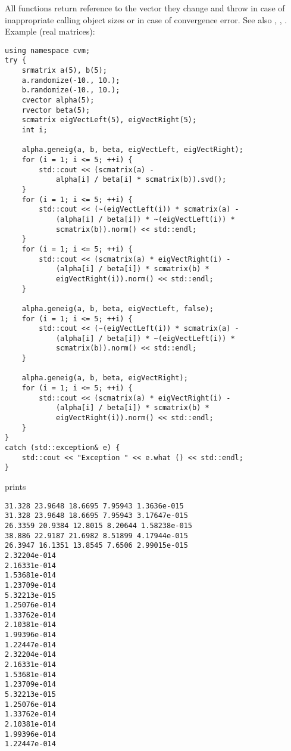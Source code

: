 All functions
return  reference to the vector they change and throw
in case of inappropriate calling object sizes
or in case of convergence error.
See also
, ,
.
Example (real matrices):
\begin{Verbatim}
using namespace cvm;
try {
    srmatrix a(5), b(5);
    a.randomize(-10., 10.);
    b.randomize(-10., 10.);
    cvector alpha(5);
    rvector beta(5);
    scmatrix eigVectLeft(5), eigVectRight(5);
    int i;

    alpha.geneig(a, b, beta, eigVectLeft, eigVectRight);
    for (i = 1; i <= 5; ++i) {
        std::cout << (scmatrix(a) -
            alpha[i] / beta[i] * scmatrix(b)).svd();
    }
    for (i = 1; i <= 5; ++i) {
        std::cout << (~(eigVectLeft(i)) * scmatrix(a) -
            (alpha[i] / beta[i]) * ~(eigVectLeft(i)) *
            scmatrix(b)).norm() << std::endl;
    }
    for (i = 1; i <= 5; ++i) {
        std::cout << (scmatrix(a) * eigVectRight(i) -
            (alpha[i] / beta[i]) * scmatrix(b) *
            eigVectRight(i)).norm() << std::endl;
    }

    alpha.geneig(a, b, beta, eigVectLeft, false);
    for (i = 1; i <= 5; ++i) {
        std::cout << (~(eigVectLeft(i)) * scmatrix(a) -
            (alpha[i] / beta[i]) * ~(eigVectLeft(i)) *
            scmatrix(b)).norm() << std::endl;
    }

    alpha.geneig(a, b, beta, eigVectRight);
    for (i = 1; i <= 5; ++i) {
        std::cout << (scmatrix(a) * eigVectRight(i) -
            (alpha[i] / beta[i]) * scmatrix(b) *
            eigVectRight(i)).norm() << std::endl;
    }
}
catch (std::exception& e) {
    std::cout << "Exception " << e.what () << std::endl;
}
\end{Verbatim}
prints
\begin{Verbatim}
31.328 23.9648 18.6695 7.95943 1.3636e-015
31.328 23.9648 18.6695 7.95943 3.17647e-015
26.3359 20.9384 12.8015 8.20644 1.58238e-015
38.886 22.9187 21.6982 8.51899 4.17944e-015
26.3947 16.1351 13.8545 7.6506 2.99015e-015
2.32204e-014
2.16331e-014
1.53681e-014
1.23709e-014
5.32213e-015
1.25076e-014
1.33762e-014
2.10381e-014
1.99396e-014
1.22447e-014
2.32204e-014
2.16331e-014
1.53681e-014
1.23709e-014
5.32213e-015
1.25076e-014
1.33762e-014
2.10381e-014
1.99396e-014
1.22447e-014
\end{Verbatim}

